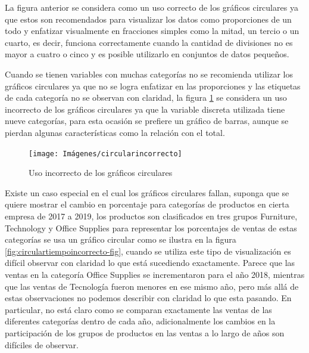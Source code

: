 \documentclass[
]{book}
\begin{document}
La figura anterior se considera como un uso correcto de los gráficos circulares ya que estos son recomendados para visualizar los datos como proporciones de un todo y enfatizar visualmente en fracciones simples como la mitad, un tercio o un cuarto, es decir, funciona correctamente cuando la cantidad de divisiones no es mayor a cuatro o cinco y es posible utilizarlo en conjuntos de datos pequeños.

Cuando se tienen variables con muchas categorías no se recomienda utilizar los gráficos circulares ya que no se logra enfatizar en las proporciones y las etiquetas de cada categoría no se observan con claridad, la figura \ref{fig:circularincorrecto-fig} se considera un uso incorrecto de los gráficos circulares ya que la variable discreta utilizada tiene nueve categorías, para esta ocasión se prefiere un gráfico de barras, aunque se pierdan algunas características como la relación con el total.

\begin{figure}

{\centering \texttt{[image: Imágenes/circularincorrecto]} 

}

\caption{Uso incorrecto de los gráficos circulares}\label{fig:circularincorrecto-fig}
\end{figure}

Existe un caso especial en el cual los gráficos circulares fallan, suponga que se quiere mostrar el cambio en porcentaje para categorías de productos en cierta empresa de 2017 a 2019, los productos son clasificados en tres grupos Furniture, Technology y Office Supplies para representar los porcentajes de ventas de estas categorías se usa un gráfico circular como se ilustra en la figura \ref{fig:circulartiempoincorrecto-fig}, cuando se utiliza este tipo de visualización es difícil observar con claridad lo que está sucediendo exactamente. Parece que las ventas en la categoría Office Supplies se incrementaron para el año 2018, mientras que las ventas de Tecnología fueron menores en ese mismo año, pero más allá de estas observaciones no podemos describir con claridad lo que esta pasando. En particular, no está claro como se comparan exactamente las ventas de las diferentes categorías dentro de cada año, adicionalmente los cambios en la participación de los grupos de productos en las ventas a lo largo de años son difíciles de observar.
\end{document}
